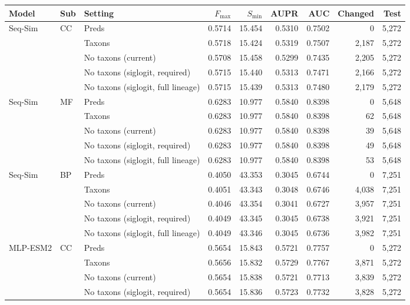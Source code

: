\begin{tabular}{lllrrrrrr}
\toprule
Model & Sub & Setting & $F_{\max}$ & $S_{\min}$ & AUPR & AUC & Changed & Test \\
\midrule
Seq-Sim & CC & Preds & 0.5714 & 15.454 & 0.5310 & 0.7502 & 0 & 5{,}272 \\
 &  & Taxons & 0.5718 & 15.424 & 0.5319 & 0.7507 & 2{,}187 & 5{,}272 \\
 &  & No taxons (current) & 0.5708 & 15.458 & 0.5299 & 0.7435 & 2{,}205 & 5{,}272 \\
 &  & No taxons (siglogit, required) & 0.5715 & 15.440 & 0.5313 & 0.7471 & 2{,}166 & 5{,}272 \\
 &  & No taxons (siglogit, full lineage) & 0.5715 & 15.439 & 0.5313 & 0.7480 & 2{,}179 & 5{,}272 \\
\addlinespace
Seq-Sim & MF & Preds & 0.6283 & 10.977 & 0.5840 & 0.8398 & 0 & 5{,}648 \\
 &  & Taxons & 0.6283 & 10.977 & 0.5840 & 0.8398 & 62 & 5{,}648 \\
 &  & No taxons (current) & 0.6283 & 10.977 & 0.5840 & 0.8398 & 39 & 5{,}648 \\
 &  & No taxons (siglogit, required) & 0.6283 & 10.977 & 0.5840 & 0.8398 & 49 & 5{,}648 \\
 &  & No taxons (siglogit, full lineage) & 0.6283 & 10.977 & 0.5840 & 0.8398 & 53 & 5{,}648 \\
\addlinespace
Seq-Sim & BP & Preds & 0.4050 & 43.353 & 0.3045 & 0.6744 & 0 & 7{,}251 \\
 &  & Taxons & 0.4051 & 43.343 & 0.3048 & 0.6746 & 4{,}038 & 7{,}251 \\
 &  & No taxons (current) & 0.4046 & 43.354 & 0.3041 & 0.6727 & 3{,}957 & 7{,}251 \\
 &  & No taxons (siglogit, required) & 0.4049 & 43.345 & 0.3045 & 0.6738 & 3{,}921 & 7{,}251 \\
 &  & No taxons (siglogit, full lineage) & 0.4049 & 43.346 & 0.3045 & 0.6736 & 3{,}982 & 7{,}251 \\
\midrule
MLP-ESM2 & CC & Preds & 0.5654 & 15.843 & 0.5721 & 0.7757 & 0 & 5{,}272 \\
 &  & Taxons & 0.5656 & 15.832 & 0.5729 & 0.7767 & 3{,}871 & 5{,}272 \\
 &  & No taxons (current) & 0.5654 & 15.838 & 0.5721 & 0.7713 & 3{,}839 & 5{,}272 \\
 &  & No taxons (siglogit, required) & 0.5654 & 15.836 & 0.5723 & 0.7732 & 3{,}828 & 5{,}272 \\

\end{tabular}
